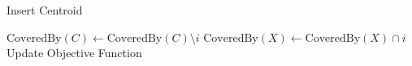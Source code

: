 \begin{algorithm}[H]
    \caption{Insert Centroid}
    \begin{algorithmic}[1]
                        \State $\text{CoveredBy}(C) \gets \text{CoveredBy}(C) \setminus i$
                        \State $\text{CoveredBy}(X) \gets \text{CoveredBy}(X) \cap i$
                        \State Update Objective Function
                    \EndIf
                \EndFor
            \EndFor
        \EndProcedure
    \end{algorithmic}
    \label{alg:bb_ic}
\end{algorithm}